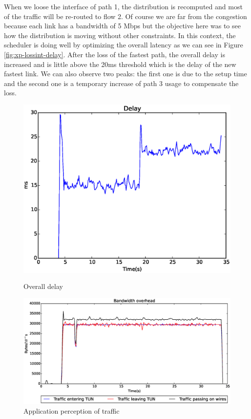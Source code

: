 When we loose the interface of path 1, the distribution is recomputed and most of the traffic will be re-routed to flow 2. Of course we are far from the congestion because each link has a bandwidth of 5 Mbps but the objective here was to see how the distribution is moving without other constraints. In this context, the scheduler is doing well by optimizing the overall latency as we can see in Figure \ref{fig:xp-lossint-delay}. After the loss of the fastest path, the overall delay is increased and is little above the  20ms threshold which is the delay of the new fastest link. We can also observe two peaks: the first one is due to the setup time and the second one is a temporary increase of path 3 usage to compensate the loss.



\begin{figure}[!ht]
\centering
\begin{minipage}{0.4\linewidth}
\includegraphics[width=\textwidth]{images/xp/intlost_delay.eps}
\caption{Overall delay}
\label{fig:xp-lossint-delay}
\end{minipage}
\begin{minipage}{0.59\linewidth}
\includegraphics[width=\textwidth]{images/xp/intlost_tun.eps}
\caption{Application perception of traffic}
\label{fig:xp-lossint-tun}
\end{minipage}
\end{figure}

